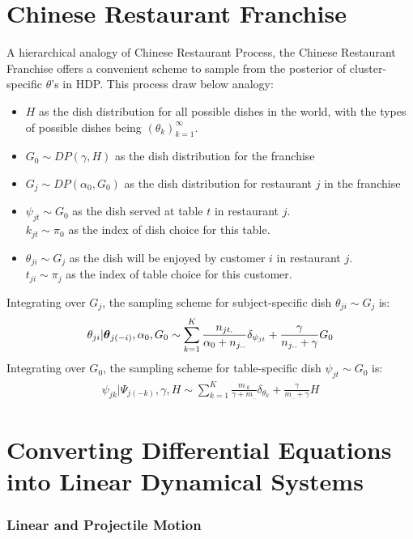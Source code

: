 \documentclass{article} %
\begin{document}
\section{Chinese Restaurant Franchise}\label{sec:CRF}
A hierarchical analogy of Chinese Restaurant Process, the Chinese Restaurant Franchise offers a convenient scheme to sample from the posterior of cluster-specific $\theta$'s in HDP. This process draw below analogy:
\begin{itemize}
\item $H$ as the dish distribution for all possible dishes in the world, with the types of possible dishes being $(\theta_k)_{k=1}^\infty$.
\item  $G_0 \sim DP(\gamma, H)$ as the dish distribution for the franchise
\item $G_j \sim DP(\alpha_0, G_0)$ as the dish distribution for restaurant $j$ in the franchise
\item $\psi_{jt} \sim G_0$ as the dish served at table $t$ in restaurant $j$.\\ $k_{jt} \sim \pi_0$ as the index of dish choice for this table.
\item $\theta_{ji} \sim G_j$ as the dish will be enjoyed by customer $i$ in restaurant $j$. \\
$t_{ji} \sim \pi_j$ as the index of table choice for this customer.
\end{itemize}
Integrating over $G_j$, the sampling scheme for subject-specific dish $\theta_{ji} \sim G_j$ is:
\begin{align*}
\theta_{ji} | \boldsymbol{\theta}_{j(-i)}, \alpha_0, G_0 \sim
\sum_{k=1}^K \frac{n_{jt.}}{\alpha_0 + n_{j..}} \delta_{\psi_{jt}} +
\frac{\gamma}{n_{j..} + \gamma} G_0
\end{align*}
Integrating over $G_0$, the sampling scheme for table-specific dish $\psi_{jt} \sim G_0$ is:
\begin{align*}
\psi_{jk} | \Psi_{j(-k)}, \gamma, H \sim
\sum_{k=1}^K \frac{m_{.k}}{\gamma + m_{..}} \delta_{\theta_{k}} +
\frac{\gamma}{m_{..} + \gamma} H
\end{align*}

\newpage
\section{Converting Differential Equations into Linear Dynamical Systems} \label{sec:ode2lds}
\subsubsection{Linear and Projectile
Motion}
\end{document}
